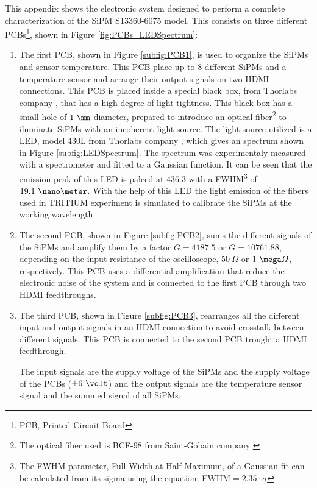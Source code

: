 This appendix shows the electronic system designed to perform a complete characterization of the SiPM S13360-6075 model. This consists on three different PCBs\footnote{PCB, Printed Circuit Board}, shown in Figure \ref{fig:PCBs_LEDSpectrum}:

\begin{enumerate}
\item{} The first PCB, shown in Figure \ref{subfig:PCB1}, is used to organize the SiPMs and sensor temperature. This PCB place up to 8 different SiPMs and a temperature sensor and arrange their output signals on two HDMI connections. This PCB is placed inside a special black box, from Thorlabs company \cite{ThorlabsCompany}, that has a high degree of light tightness. This black box has a small hole of $1~\mm$ diameter, prepared to introduce an optical fiber\footnote{The optical fiber used is BCF-98 from Saint-Gobain company \cite{OpticalFibers}} to iluminate SiPMs with an incoherent light source. The light source utilized is a LED, model 430L from Thorlabs company \cite{LEDThorlabs}, which gives an spectrum shown in Figure \ref{subfig:LEDSpectrum}. The spectrum was experimentaly measured with a spectrometer and fitted to a Gaussian function. It can be seen that the emission peak of this LED is palced at $436.3$ with a FWHM\footnote{The FWHM parameter, Full Width at Half Maximum, of a Gaussian fit can be calculated from its sigma using the equation: FWHM$=2.35 \cdot{} \sigma$} of $19.1~\nano\meter$. With the help of this LED the light emission of the fibers used in TRITIUM experiment is simulated to calibrate the SiPMs at the working wavelength. 

\item{} The second PCB, shown in Figure \ref{subfig:PCB2}, sums the different signals of the SiPMs and amplify them by a factor $G=4187.5$ or $G=10761.88$, depending on the input resistance of the oscilloscope, $50~\varOmega$ or $1~\mega\varOmega$, respectively. This PCB uses a differential amplification that reduce the electronic noise of the system and is connected to the first PCB through two HDMI feedthroughs.

\item{} The third PCB, shown in Figure \ref{subfig:PCB3}, rearranges all the different input and output signals in an HDMI connection to avoid crosstalk between different signals. This PCB is connected to the second PCB trought a HDMI feedthrough.

The input signals are the supply voltage of the SiPMs and the supply voltage of the PCBs ($\pm 6~\volt$) and the output signals are the temperature sensor signal and the summed signal of all SiPMs. 

\end{enumerate}


